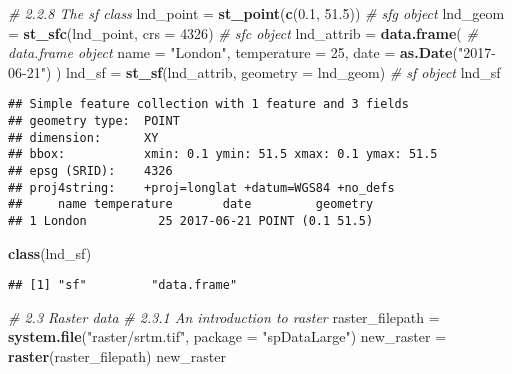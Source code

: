 \documentclass[]{article}
\newenvironment{Shaded}{\begin{snugshade}}{\end{snugshade}}
\newcommand{\CommentTok}[1]{\textcolor[rgb]{0.56,0.35,0.01}{\textit{#1}}}
\newcommand{\DataTypeTok}[1]{\textcolor[rgb]{0.13,0.29,0.53}{#1}}
\newcommand{\DecValTok}[1]{\textcolor[rgb]{0.00,0.00,0.81}{#1}}
\newcommand{\FloatTok}[1]{\textcolor[rgb]{0.00,0.00,0.81}{#1}}
\newcommand{\KeywordTok}[1]{\textcolor[rgb]{0.13,0.29,0.53}{\textbf{#1}}}
\newcommand{\NormalTok}[1]{#1}
\newcommand{\StringTok}[1]{\textcolor[rgb]{0.31,0.60,0.02}{#1}}
\begin{document}
\begin{Shaded}
\begin{Highlighting}[]
\CommentTok{# 2.2.8 The sf class}
\NormalTok{lnd_point =}\StringTok{ }\KeywordTok{st_point}\NormalTok{(}\KeywordTok{c}\NormalTok{(}\FloatTok{0.1}\NormalTok{, }\FloatTok{51.5}\NormalTok{))                 }\CommentTok{# sfg object}
\NormalTok{lnd_geom =}\StringTok{ }\KeywordTok{st_sfc}\NormalTok{(lnd_point, }\DataTypeTok{crs =} \DecValTok{4326}\NormalTok{)           }\CommentTok{# sfc object}
\NormalTok{lnd_attrib =}\StringTok{ }\KeywordTok{data.frame}\NormalTok{(                           }\CommentTok{# data.frame object}
  \DataTypeTok{name =} \StringTok{"London"}\NormalTok{,}
  \DataTypeTok{temperature =} \DecValTok{25}\NormalTok{,}
  \DataTypeTok{date =} \KeywordTok{as.Date}\NormalTok{(}\StringTok{"2017-06-21"}\NormalTok{)}
\NormalTok{)}
\NormalTok{lnd_sf =}\StringTok{ }\KeywordTok{st_sf}\NormalTok{(lnd_attrib, }\DataTypeTok{geometry =}\NormalTok{ lnd_geom)    }\CommentTok{# sf object}
\NormalTok{lnd_sf}
\end{Highlighting}
\end{Shaded}

\begin{verbatim}
## Simple feature collection with 1 feature and 3 fields
## geometry type:  POINT
## dimension:      XY
## bbox:           xmin: 0.1 ymin: 51.5 xmax: 0.1 ymax: 51.5
## epsg (SRID):    4326
## proj4string:    +proj=longlat +datum=WGS84 +no_defs
##     name temperature       date         geometry
## 1 London          25 2017-06-21 POINT (0.1 51.5)
\end{verbatim}

\begin{Shaded}
\begin{Highlighting}[]
\KeywordTok{class}\NormalTok{(lnd_sf)}
\end{Highlighting}
\end{Shaded}

\begin{verbatim}
## [1] "sf"         "data.frame"
\end{verbatim}

\begin{Shaded}
\begin{Highlighting}[]
\CommentTok{# 2.3 Raster data}
\CommentTok{# 2.3.1 An introduction to raster}
\NormalTok{raster_filepath =}\StringTok{ }\KeywordTok{system.file}\NormalTok{(}\StringTok{"raster/srtm.tif"}\NormalTok{, }\DataTypeTok{package =} \StringTok{"spDataLarge"}\NormalTok{)}
\NormalTok{new_raster =}\StringTok{ }\KeywordTok{raster}\NormalTok{(raster_filepath)}
\NormalTok{new_raster}
\end{Highlighting}
\end{Shaded}
\end{document}
